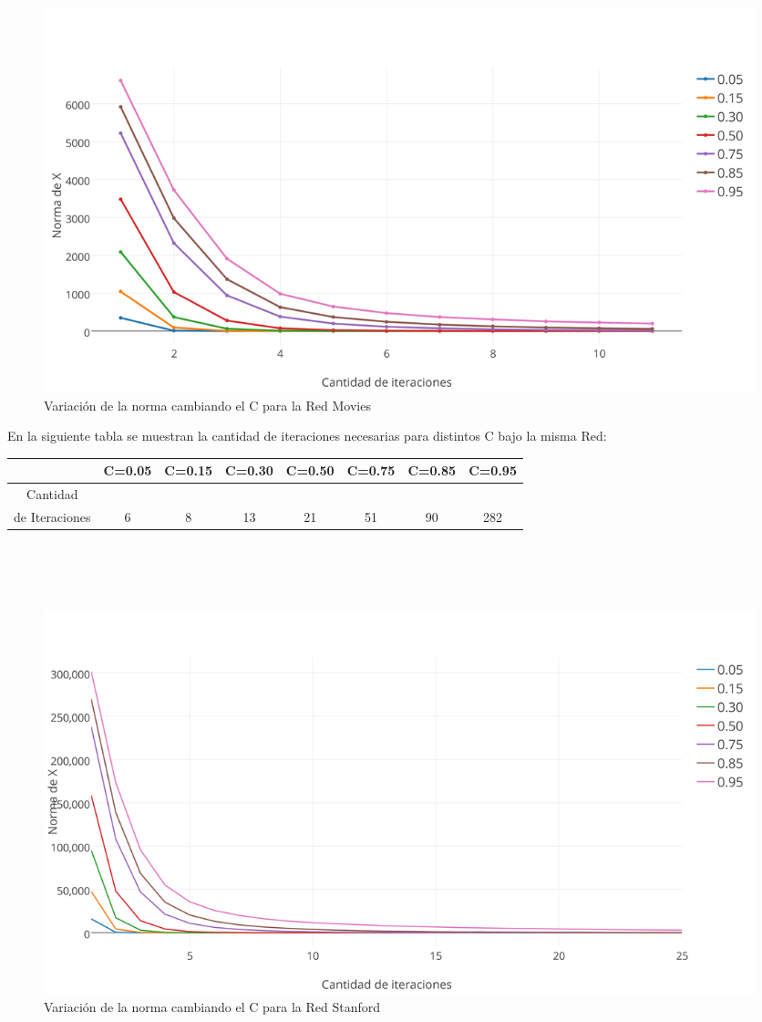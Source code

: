 \documentclass[a4paper]{article}
\begin{document}
\begin{figure}[h!]
  \begin{center}
	\includegraphics[scale=0.50]{imagenes/exp12/moviesPAGERANK.png}
	\caption{Variaci\'on de la norma cambiando el C para la Red Movies}
	\label{nombreparareferenciar}
  \end{center}
\end{figure}
En la siguiente tabla se muestran la cantidad de iteraciones necesarias para distintos C bajo la misma Red: \\
 \begin{tabular}[c]{|c|c|c|c|c|c|c|c|}
\hline
& C=0.05 & C=0.15 & C=0.30 & C=0.50 & C=0.75 & C=0.85 & C=0.95 \\
\hline
Cantidad &  & & & & & & \\ 
de Iteraciones & 6 & 8 & 13 & 21 & 51 & 90 & 282 \\
\hline
	\end{tabular}\\\\
\\

\begin{figure}[h!]
  \begin{center}
	\includegraphics[scale=0.50]{imagenes/exp12/stanfordPAGERANK.png}
	\caption{Variaci\'on de la norma cambiando el C para la Red Stanford}
	\label{nombreparareferenciar}
  \end{center}
\end{figure}
\end{document}
